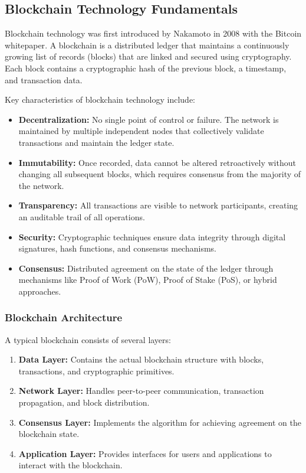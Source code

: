 \documentclass[a4paper,13pt,twoside]{report}
\theoremstyle{definition}
\begin{document}
\subsection{Blockchain Technology Fundamentals}

Blockchain technology was first introduced by Nakamoto in 2008 with the Bitcoin whitepaper\cite{nakamoto2008bitcoin}. A blockchain is a distributed ledger that maintains a continuously growing list of records (blocks) that are linked and secured using cryptography. Each block contains a cryptographic hash of the previous block, a timestamp, and transaction data.

Key characteristics of blockchain technology include:

\begin{itemize}
    \item \textbf{Decentralization:} No single point of control or failure. The network is maintained by multiple independent nodes that collectively validate transactions and maintain the ledger state.

    \item \textbf{Immutability:} Once recorded, data cannot be altered retroactively without changing all subsequent blocks, which requires consensus from the majority of the network.

    \item \textbf{Transparency:} All transactions are visible to network participants, creating an auditable trail of all operations.

    \item \textbf{Security:} Cryptographic techniques ensure data integrity through digital signatures, hash functions, and consensus mechanisms.

    \item \textbf{Consensus:} Distributed agreement on the state of the ledger through mechanisms like Proof of Work (PoW), Proof of Stake (PoS), or hybrid approaches.
\end{itemize}

\subsubsection{Blockchain Architecture}

A typical blockchain consists of several layers:

\begin{enumerate}
    \item \textbf{Data Layer:} Contains the actual blockchain structure with blocks, transactions, and cryptographic primitives.

    \item \textbf{Network Layer:} Handles peer-to-peer communication, transaction propagation, and block distribution.

    \item \textbf{Consensus Layer:} Implements the algorithm for achieving agreement on the blockchain state.

    \item \textbf{Application Layer:} Provides interfaces for users and applications to interact with the blockchain.
\end{enumerate}
\end{document}
